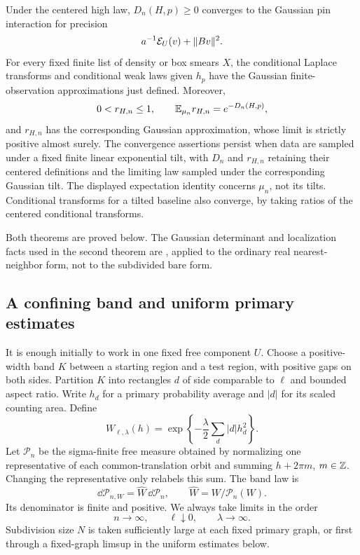 \begin{theorem}
\label{thm:pin-interaction}
Under the centered high law, \(D_n(H,p)\ge0\) converges to the
Gaussian pin interaction for precision
\[
                 a^{-1}\mathcal E_U(v)+\lVert Bv\rVert^2.
\]
For every fixed finite list of density or box smears \(X\), the
conditional Laplace transforms and conditional weak laws given
\(h_p\) have the Gaussian finite-observation approximations just
defined. Moreover,
\[
 0<r_{H,n}\le1,\qquad
 \mathbb E_{\mu_n}r_{H,n}=e^{-D_n(H,p)},
\]
and \(r_{H,n}\) has the corresponding Gaussian approximation,
whose limit is strictly positive almost surely.
The convergence assertions persist when data are sampled under
a fixed finite linear exponential tilt, with \(D_n\) and
\(r_{H,n}\) retaining their centered definitions and the limiting
law sampled under the corresponding Gaussian tilt.
The displayed expectation identity concerns \(\mu_n\), not its
tilts. Conditional transforms for a tilted baseline also
converge, by taking ratios of the centered conditional transforms.
\end{theorem}

Both theorems are proved below. The Gaussian determinant and
localization facts used in the second theorem are
, applied to the ordinary real
nearest-neighbor form, not to the subdivided bare form.

\subsection{A confining band and uniform primary estimates}

It is enough initially to work in one fixed free component \(U\).
Choose a positive-width band \(K\) between a starting region and
a test region, with positive gaps on both sides. Partition \(K\)
into rectangles \(d\) of side comparable to \(\ell\) and bounded
aspect ratio. Write \(h_d\) for a primary probability average and
\(|d|\) for its scaled counting area. Define
\begin{equation}
 W_{\ell,\lambda}(h)=
 \exp\left\{-\frac{\lambda}{2}\sum_d|d|h_d^2\right\}.
 \label{eq:pins-band}
\end{equation}
Let \(\mathcal P_n\) be the sigma-finite free measure obtained by
normalizing one representative of each common-translation orbit
and summing \(h+2\pi m\), \(m\in\mathbb Z\). Changing the representative
only relabels this sum. The band law is
\[
 \dd\mathcal P_{n,W}=\widehat W\,\dd\mathcal P_n,\qquad
 \widehat W=W/\mathcal P_n(W).
\]
Its denominator is finite and positive. We always take limits in
the order
\begin{equation}
 n\longrightarrow\infty,\qquad
 \ell\downarrow0,\qquad
 \lambda\longrightarrow\infty.
 \label{eq:pins-limit-order}
\end{equation}
Subdivision size \(N\) is taken sufficiently large at each fixed
primary graph, or first through a fixed-graph limsup in the
uniform estimates below.

